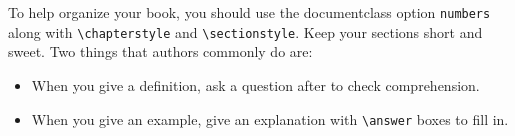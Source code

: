 \documentclass{ximera}
\begin{document}
To help organize your book, you should use the documentclass option \verb!numbers! along with  \texttt{\textbackslash chapterstyle} and 
\texttt{\textbackslash sectionstyle}. Keep your sections short and sweet. Two things that authors commonly do are:
\begin{itemize}
  \item When you give a definition, ask a question after to check comprehension. 
  \item When you give an example, give an explanation with
        \texttt{\textbackslash answer} boxes to fill in.
\end{itemize}
\pdfOnly{\end{multicols}}
\pdfOnly{\twocolumn}
\end{document}
